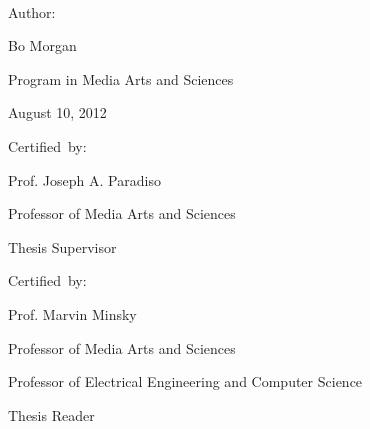 \thispagestyle{empty}
\begin{center}
    \spacedlowsmallcaps{\myName} \\ \medskip                        

    \begingroup
        \color{Maroon}\spacedallcaps{\myTitle}
    \endgroup
\end{center}        

\vspace{40mm}

\begin{flushright}
  \vspace{10mm}

  Author:\hspace{0.5cm}~\makebox[2.75in]{\hrulefill}

                                 Bo Morgan

                                 Program in Media Arts and Sciences
                                 
                                 August 10, 2012
                                 
  \vspace{10mm}
  
  Certified~by:\hspace{0.5cm}~\makebox[2.75in]{\hrulefill}

                                 Prof. Joseph A. Paradiso

                                 Professor of Media Arts and Sciences
                                 
                                 Thesis Supervisor

  \vspace{10mm}
  
  Certified~by:\hspace{0.5cm}~\makebox[2.75in]{\hrulefill}
  
                                 Prof. Marvin Minsky

                                 Professor of Media Arts and Sciences

                                 Professor of Electrical Engineering and Computer Science
                                 
                                 Thesis Reader


\end{flushright}
